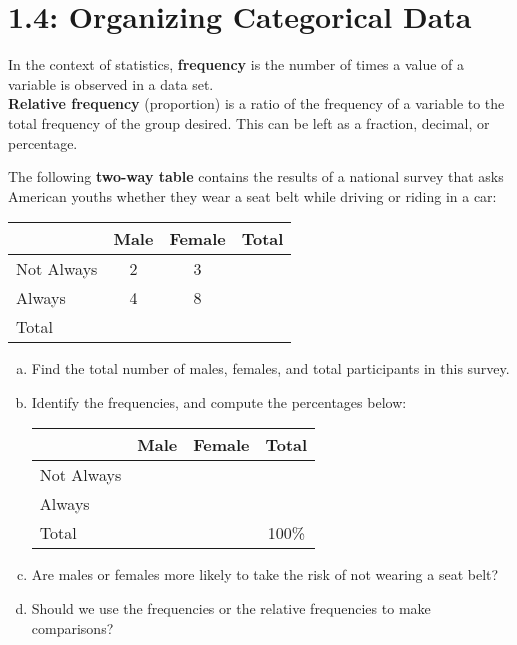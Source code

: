 \documentclass[../mathNotesPreamble]{subfiles}
\providecommand{\relscalefact}{1.4}
\begin{document}
\relscale{\relscalefact}
  \section{1.4: Organizing Categorical Data}
    \begin{defn*}
      In the context of statistics, \textbf{frequency} is the number of times a value of a variable is observed in a data set.\\
\textbf{Relative frequency} (proportion) is a ratio of the frequency of a variable to the total frequency of the group desired. This can be left as a fraction, decimal, or percentage.
    \end{defn*}

    \begin{ex*}
      The following \textbf{two-way table} contains the results of a national survey that asks American youths whether they wear a seat belt while driving or riding in a car:
    \end{ex*}
    \begin{center}
      \begin{tabular}{@{}l*{3}{c}@{}}\toprule
        & Male & Female & Total\\\midrule
        Not Always& 2& 3& \\
        Always& 4& 8& \\\midrule
        Total\\\bottomrule
      \end{tabular}
    \end{center}
    \begin{enumerate}[a)]
      \item Find the total number of males, females, and total participants in this survey.
      \item Identify the frequencies, and compute the percentages below:
        \begin{center}
          \hspace*{-30pt}
          \begin{tabular}{@{}l*{3}{c}@{}}\toprule
            & Male & Female & Total\\\midrule
            Not Always& & & \\
            Always& & & \\\midrule
            Total&&&100\%\\\bottomrule
          \end{tabular}
        \end{center}
      \item Are males or females more likely to take the risk of not wearing a seat belt?\\[\stretch{1}]
      \item Should we use the frequencies or the relative frequencies to make comparisons?
    \end{enumerate}

  \pagebreak
\end{document}
